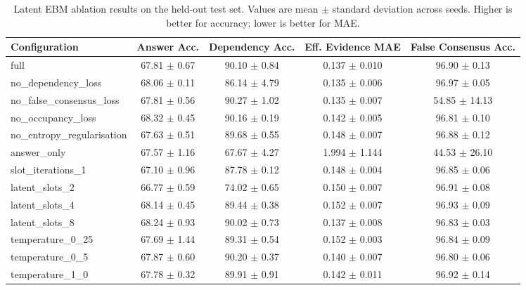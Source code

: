 \begin{table}[t]
\centering
\caption{Latent EBM ablation results on the held-out test set. Values are mean $\pm$ standard deviation across seeds. Higher is better for accuracy; lower is better for MAE.}
\label{tab:latent-ablation}
\small
\begin{tabular}{lcccc}
\toprule
Configuration & Answer Acc. & Dependency Acc. & Eff. Evidence MAE & False Consensus Acc. \\
\midrule
full & 67.81 $\pm$ 0.67 & 90.10 $\pm$ 0.84 & 0.137 $\pm$ 0.010 & 96.90 $\pm$ 0.13 \\
no\_dependency\_loss & 68.06 $\pm$ 0.11 & 86.14 $\pm$ 4.79 & 0.135 $\pm$ 0.006 & 96.97 $\pm$ 0.05 \\
no\_false\_consensus\_loss & 67.81 $\pm$ 0.56 & 90.27 $\pm$ 1.02 & 0.135 $\pm$ 0.007 & 54.85 $\pm$ 14.13 \\
no\_occupancy\_loss & 68.32 $\pm$ 0.45 & 90.16 $\pm$ 0.19 & 0.142 $\pm$ 0.005 & 96.81 $\pm$ 0.10 \\
no\_entropy\_regularisation & 67.63 $\pm$ 0.51 & 89.68 $\pm$ 0.55 & 0.148 $\pm$ 0.007 & 96.88 $\pm$ 0.12 \\
answer\_only & 67.57 $\pm$ 1.16 & 67.67 $\pm$ 4.27 & 1.994 $\pm$ 1.144 & 44.53 $\pm$ 26.10 \\
slot\_iterations\_1 & 67.10 $\pm$ 0.96 & 87.78 $\pm$ 0.12 & 0.148 $\pm$ 0.004 & 96.85 $\pm$ 0.06 \\
latent\_slots\_2 & 66.77 $\pm$ 0.59 & 74.02 $\pm$ 0.65 & 0.150 $\pm$ 0.007 & 96.91 $\pm$ 0.08 \\
latent\_slots\_4 & 68.14 $\pm$ 0.45 & 89.44 $\pm$ 0.38 & 0.152 $\pm$ 0.007 & 96.93 $\pm$ 0.09 \\
latent\_slots\_8 & 68.24 $\pm$ 0.93 & 90.02 $\pm$ 0.73 & 0.137 $\pm$ 0.008 & 96.83 $\pm$ 0.03 \\
temperature\_0\_25 & 67.69 $\pm$ 1.44 & 89.31 $\pm$ 0.54 & 0.152 $\pm$ 0.003 & 96.84 $\pm$ 0.09 \\
temperature\_0\_5 & 67.87 $\pm$ 0.60 & 90.20 $\pm$ 0.37 & 0.140 $\pm$ 0.007 & 96.80 $\pm$ 0.06 \\
temperature\_1\_0 & 67.78 $\pm$ 0.32 & 89.91 $\pm$ 0.91 & 0.142 $\pm$ 0.011 & 96.92 $\pm$ 0.14 \\
\bottomrule
\end{tabular}
\end{table}
